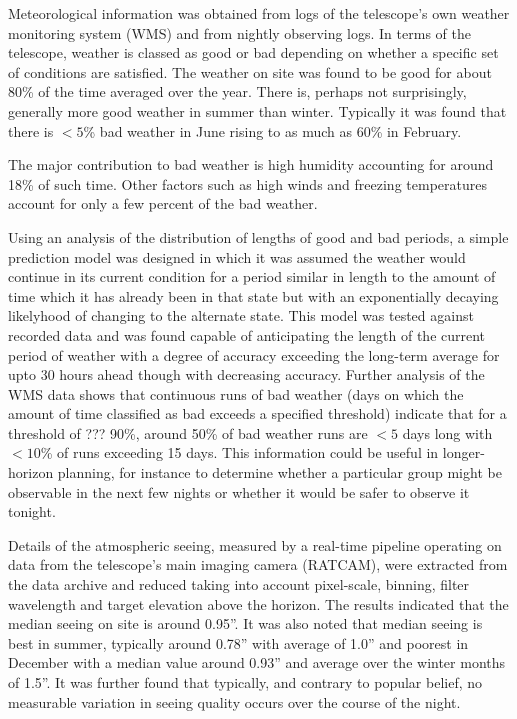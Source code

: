  Meteorological information was obtained from logs of the telescope's own weather monitoring system (WMS) and from nightly observing logs. In terms of the telescope, weather is classed as good or bad depending on whether a specific set of conditions are satisfied. The weather on site was found to be good for about 80\% of the time averaged over the year. There is, perhaps not surprisingly, generally more good weather in summer than winter. Typically it was found that there is $<5$\% bad weather in June rising to as much as 60\% in February.

 The major contribution to bad weather is high humidity accounting for around 18\% of such time. Other factors such as high winds and freezing temperatures account for only a few percent of the bad weather. 

Using an analysis of the distribution of lengths of good and bad periods, a simple prediction model was designed in which it was assumed the weather would continue in its current condition for a period similar in length to the amount of time which it has already been in that state but with an exponentially decaying likelyhood of changing to the alternate state. This model was tested against recorded data and was found capable of anticipating the length of the current period of weather with a degree of accuracy exceeding the long-term average for upto 30 hours ahead though with decreasing accuracy. 
Further analysis of the WMS data shows that continuous runs of bad weather (days on which the amount of time classified as bad exceeds a specified threshold) indicate that for a threshold of ??? 90\%, around 50\% of bad weather runs are $<5$ days long with $<10$\% of runs exceeding 15 days. This information could be useful in longer-horizon planning, for instance to determine whether a particular group might be observable in the next few nights or whether it would be safer to observe it tonight.

Details of the atmospheric seeing, measured by a real-time pipeline operating on data from the telescope's main imaging camera (RATCAM), were extracted from the data archive and reduced taking into account pixel-scale, binning, filter wavelength and target elevation above the horizon. The results indicated that the median seeing on site is around 0.95''. It was also noted that median seeing is best in summer, typically around 0.78'' with average of 1.0'' and poorest in December with a median value around 0.93'' and average over the winter months of 1.5''. It was further found that typically, and contrary to popular belief, no measurable variation in seeing quality occurs over the course of the night.


